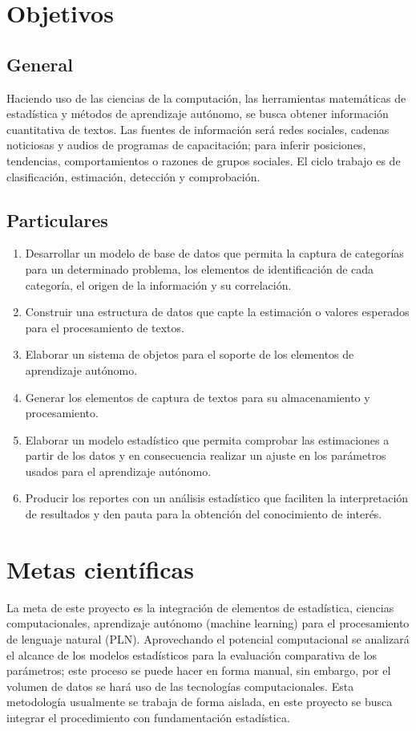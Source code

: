 \section {Objetivos}
\subsection {General}
Haciendo uso de las ciencias de la computación, las herramientas matemáticas de estadística y métodos de aprendizaje autónomo, se busca obtener información cuantitativa de textos. Las fuentes de información será redes sociales, cadenas noticiosas y audios de programas de capacitación; para inferir posiciones, tendencias, comportamientos o razones de grupos sociales. El ciclo trabajo es de clasificación, estimación, detección y comprobación.
\subsection {Particulares}
\begin{enumerate}
    \item Desarrollar un modelo de base de datos que permita la captura de categorías para un determinado problema, los elementos de identificación de cada categoría, el origen de la información y su correlación.
    \item Construir una estructura de datos que capte la estimación o valores esperados para el procesamiento de textos.
    \item Elaborar un sistema de objetos para el soporte de los elementos de aprendizaje autónomo.
    \item Generar los elementos de captura de textos para su almacenamiento y procesamiento.
    \item Elaborar un modelo estadístico que permita comprobar las estimaciones a partir de los datos y en consecuencia realizar un ajuste en los parámetros usados para el aprendizaje autónomo.
    \item Producir los reportes con un análisis estadístico que faciliten la interpretación de resultados y den pauta para la obtención del conocimiento de interés.
\end{enumerate}
\section {Metas científicas}
La meta de este proyecto es la integración de elementos de estadística, ciencias computacionales, aprendizaje autónomo (machine learning) para el procesamiento de lenguaje natural (PLN). Aprovechando el potencial computacional se analizará el alcance de los modelos estadísticos para la evaluación comparativa de los parámetros; este proceso se puede hacer en forma manual, sin embargo, por el volumen de datos se hará uso de las tecnologías computacionales.
Esta metodología usualmente se trabaja de forma aislada, en este proyecto se busca integrar el procedimiento con fundamentación estadística.